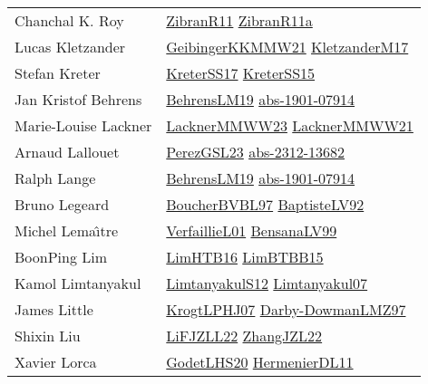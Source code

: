 {\begin{longtable}{p{4cm}p{20cm}}
Chanchal K. Roy & \href{papers/ZibranR11.pdf}{ZibranR11}\cite{ZibranR11} \href{papers/ZibranR11a.pdf}{ZibranR11a}\cite{ZibranR11a} \\
Lucas Kletzander & \href{papers/GeibingerKKMMW21.pdf}{GeibingerKKMMW21}\cite{GeibingerKKMMW21} \href{papers/KletzanderM17.pdf}{KletzanderM17}\cite{KletzanderM17} \\
Stefan Kreter & \href{articles/KreterSS17.pdf}{KreterSS17}\cite{KreterSS17} \href{papers/KreterSS15.pdf}{KreterSS15}\cite{KreterSS15} \\
Jan Kristof Behrens & \href{papers/BehrensLM19.pdf}{BehrensLM19}\cite{BehrensLM19} \href{articles/abs-1901-07914.pdf}{abs-1901-07914}\cite{abs-1901-07914} \\
Marie{-}Louise Lackner & \href{articles/LacknerMMWW23.pdf}{LacknerMMWW23}\cite{LacknerMMWW23} \href{papers/LacknerMMWW21.pdf}{LacknerMMWW21}\cite{LacknerMMWW21} \\
Arnaud Lallouet & \href{papers/PerezGSL23.pdf}{PerezGSL23}\cite{PerezGSL23} \href{articles/abs-2312-13682.pdf}{abs-2312-13682}\cite{abs-2312-13682} \\
Ralph Lange & \href{papers/BehrensLM19.pdf}{BehrensLM19}\cite{BehrensLM19} \href{articles/abs-1901-07914.pdf}{abs-1901-07914}\cite{abs-1901-07914} \\
Bruno Legeard & \href{}{BoucherBVBL97}\cite{BoucherBVBL97} \href{papers/BaptisteLV92.pdf}{BaptisteLV92}\cite{BaptisteLV92} \\
Michel Lema{\^{\i}}tre & \href{papers/VerfaillieL01.pdf}{VerfaillieL01}\cite{VerfaillieL01} \href{articles/BensanaLV99.pdf}{BensanaLV99}\cite{BensanaLV99} \\
BoonPing Lim & \href{papers/LimHTB16.pdf}{LimHTB16}\cite{LimHTB16} \href{papers/LimBTBB15.pdf}{LimBTBB15}\cite{LimBTBB15} \\
Kamol Limtanyakul & \href{articles/LimtanyakulS12.pdf}{LimtanyakulS12}\cite{LimtanyakulS12} \href{papers/Limtanyakul07.pdf}{Limtanyakul07}\cite{Limtanyakul07} \\
James Little & \href{papers/KrogtLPHJ07.pdf}{KrogtLPHJ07}\cite{KrogtLPHJ07} \href{articles/Darby-DowmanLMZ97.pdf}{Darby-DowmanLMZ97}\cite{Darby-DowmanLMZ97} \\
Shixin Liu & \href{papers/LiFJZLL22.pdf}{LiFJZLL22}\cite{LiFJZLL22} \href{papers/ZhangJZL22.pdf}{ZhangJZL22}\cite{ZhangJZL22} \\
Xavier Lorca & \href{papers/GodetLHS20.pdf}{GodetLHS20}\cite{GodetLHS20} \href{papers/HermenierDL11.pdf}{HermenierDL11}\cite{HermenierDL11} \\

\end{longtable}}
